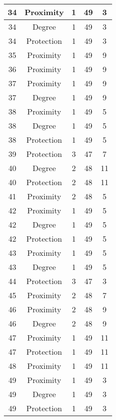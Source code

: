 \documentclass[results.tex]{subfiles}
\begin{document}
\begin{center}
\begin{tabular}{| c || c | c | c | c |}
    \hline
    34 & Proximity & 1 & 49 & 3 \\ 
    \hline
    34 & Degree & 1 & 49 & 3 \\ 
    \hline
    34 & Protection & 1 & 49 & 3 \\ 
    \hline
    35 & Proximity & 1 & 49 & 9 \\ 
    \hline
    36 & Proximity & 1 & 49 & 9 \\ 
    \hline
    37 & Proximity & 1 & 49 & 9 \\ 
    \hline
    37 & Degree & 1 & 49 & 9 \\ 
    \hline
    38 & Proximity & 1 & 49 & 5 \\ 
    \hline
    38 & Degree & 1 & 49 & 5 \\ 
    \hline
    38 & Protection & 1 & 49 & 5 \\ 
    \hline
    39 & Protection & 3 & 47 & 7 \\ 
    \hline
    40 & Degree & 2 & 48 & 11 \\ 
    \hline
    40 & Protection & 2 & 48 & 11 \\ 
    \hline
    41 & Proximity & 2 & 48 & 5 \\ 
    \hline
    42 & Proximity & 1 & 49 & 5 \\ 
    \hline
    42 & Degree & 1 & 49 & 5 \\ 
    \hline
    42 & Protection & 1 & 49 & 5 \\ 
    \hline
    43 & Proximity & 1 & 49 & 5 \\ 
    \hline
    43 & Degree & 1 & 49 & 5 \\ 
    \hline
    44 & Protection & 3 & 47 & 3 \\ 
    \hline
    45 & Proximity & 2 & 48 & 7 \\ 
    \hline
    46 & Proximity & 2 & 48 & 9 \\ 
    \hline
    46 & Degree & 2 & 48 & 9 \\ 
    \hline
    47 & Proximity & 1 & 49 & 11 \\ 
    \hline
    47 & Protection & 1 & 49 & 11 \\ 
    \hline
    48 & Proximity & 1 & 49 & 11 \\ 
    \hline
    49 & Proximity & 1 & 49 & 3 \\ 
    \hline
    49 & Degree & 1 & 49 & 3 \\ 
    \hline
    49 & Protection & 1 & 49 & 3 \\ 
    \hline   \end{tabular}
\end{center}
\end{document}
